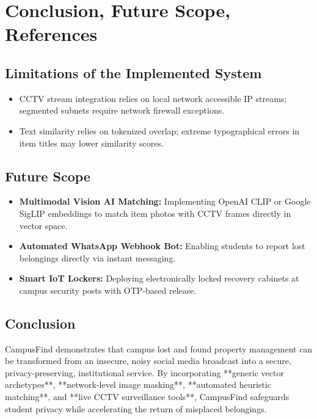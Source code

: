\documentclass[11pt,a4paper]{article}
\begin{document}
\newpage

\section{Conclusion, Future Scope, References}

\subsection{Limitations of the Implemented System}
\begin{itemize}
    \item CCTV stream integration relies on local network accessible IP streams; segmented subnets require network firewall exceptions.
    \item Text similarity relies on tokenized overlap; extreme typographical errors in item titles may lower similarity scores.
\end{itemize}

\subsection{Future Scope}
\begin{itemize}
    \item \textbf{Multimodal Vision AI Matching:} Implementing OpenAI CLIP or Google SigLIP embeddings to match item photos with CCTV frames directly in vector space.
    \item \textbf{Automated WhatsApp Webhook Bot:} Enabling students to report lost belongings directly via instant messaging.
    \item \textbf{Smart IoT Lockers:} Deploying electronically locked recovery cabinets at campus security posts with OTP-based release.
\end{itemize}

\subsection{Conclusion}
CampusFind demonstrates that campus lost and found property management can be transformed from an insecure, noisy social media broadcast into a secure, privacy-preserving, institutional service. By incorporating **generic vector archetypes**, **network-level image masking**, **automated heuristic matching**, and **live CCTV surveillance tools**, CampusFind safeguards student privacy while accelerating the return of misplaced belongings.
\end{document}

